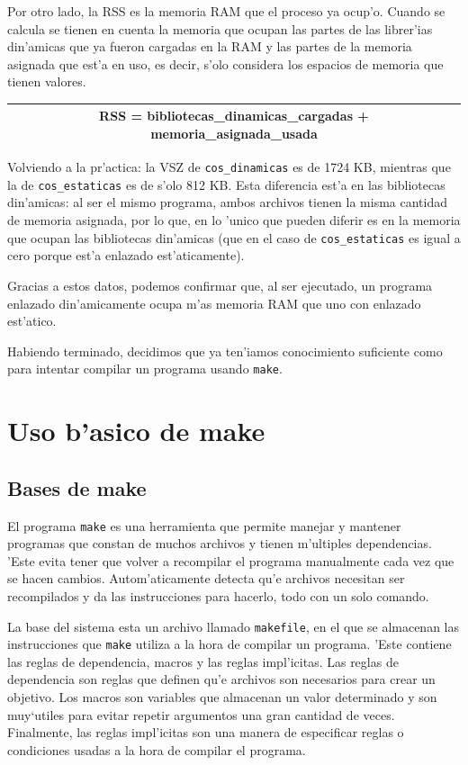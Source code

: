 \documentclass[11pt]{article}
\begin{document}
		Por otro lado, la RSS es la memoria RAM que el proceso ya ocup'o. Cuando se calcula se tienen en cuenta la memoria que ocupan las partes de las librer'ias din'amicas que ya fueron cargadas en la RAM y las partes de la memoria asignada que est'a en uso, es decir, s'olo considera los espacios de memoria que tienen valores. %

		\begin{table}[H]
    			\centering
    			\begin{tabular}{|c|}
        			 \hline RSS = bibliotecas\_dinamicas\_cargadas + memoria\_asignada\_usada \\\hline
    			\end{tabular}
    			\label{tab:my_label}
		\end{table}

		Volviendo a la pr'actica: la VSZ de \texttt{cos\_dinamicas} es de 1724 KB, mientras que la de \texttt{cos\_estaticas} es de s'olo 812 KB.
Esta diferencia est'a en las bibliotecas din'amicas: al ser el mismo programa, ambos archivos tienen la misma cantidad de memoria asignada, por lo que, en lo 'unico que pueden diferir es en la memoria que ocupan las bibliotecas din'amicas (que en el caso de \texttt{cos\_estaticas} es igual a cero porque est'a enlazado est'aticamente).  

		Gracias a estos datos, podemos confirmar que, al ser ejecutado, un programa enlazado din'amicamente ocupa m'as memoria RAM que uno con enlazado est'atico.

		Habiendo terminado, decidimos que ya ten'iamos conocimiento suficiente como para intentar compilar un programa usando \texttt{make}.

		
	\section{Uso b'asico de make}
	\subsection{Bases de make}
		El programa \texttt{make} es una herramienta que permite manejar y mantener programas que constan de muchos archivos y tienen m'ultiples dependencias. 'Este evita tener que volver a recompilar el programa manualmente cada vez que se hacen cambios. Autom'aticamente detecta qu'e archivos necesitan ser recompilados y da las instrucciones para hacerlo, todo con un solo comando.
		
		La base del sistema esta un archivo llamado \texttt{makefile}, en el que se almacenan las instrucciones que \texttt{make} utiliza a la hora de compilar un programa. 'Este contiene las reglas de dependencia, macros y las reglas impl'icitas. Las reglas de dependencia son reglas que definen qu'e archivos son necesarios para crear un objetivo\footnotemark. Los macros son variables que almacenan un valor determinado y son muy`utiles para evitar repetir argumentos una gran cantidad de veces. Finalmente, las reglas impl'icitas son una manera de especificar reglas o condiciones usadas a la hora de compilar el programa.
		
\end{document}

